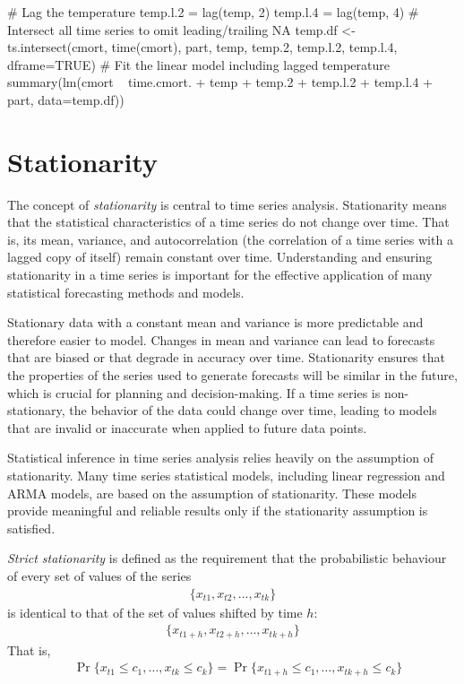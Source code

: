 \begin{samepage}
\begin{Rcode}
# Lag the temperature
temp.l.2 = lag(temp, 2)
temp.l.4 = lag(temp, 4)
# Intersect all time series to omit leading/trailing NA
temp.df <- ts.intersect(cmort, time(cmort), part, 
                  temp, temp.2, temp.l.2, temp.l.4, dframe=TRUE)
# Fit the linear model including lagged temperature
summary(lm(cmort ~ time.cmort. + temp + temp.2 + 
                      temp.l.2 + temp.l.4 + part, data=temp.df))
\end{Rcode}
\end{samepage}

\section{Stationarity}

The concept of \emph{stationarity} is central to time series analysis. Stationarity means that the statistical characteristics of a time series do not change over time. That is, its mean, variance, and autocorrelation (the correlation of a time series with a lagged copy of itself) remain constant over time. Understanding and ensuring stationarity in a time series is important for the effective application of many statistical forecasting methods and models.

Stationary data with a constant mean and variance is more predictable and therefore easier to model. Changes in mean and variance can lead to forecasts that are biased or that degrade in accuracy over time. Stationarity ensures that the properties of the series used to generate forecasts will be similar in the future, which is crucial for planning and decision-making. If a time series is non-stationary, the behavior of the data could change over time, leading to models that are invalid or inaccurate when applied to future data points.

Statistical inference in time series analysis relies heavily on the assumption of stationarity. Many time series statistical models, including linear regression and ARMA models, are based on the assumption of stationarity. These models provide meaningful and reliable results only if the stationarity assumption is satisfied. 

\emph{Strict stationarity} is defined as the requirement that the probabilistic behaviour of every set of values of the series
\begin{align*}\{x_{t1}, x_{t2}, \ldots, x_{tk} \} \end{align*}
\noindent is identical to that of the set of values shifted by time $h$:
\begin{align*}
\{x_{t1+h}, x_{t2+h}, \ldots, x_{tk + h} \}
\end{align*}
\noindent That is,
\begin{align*}
&\Pr \{ x_{t1} \leq c_1, \ldots, x_{tk} \leq c_k \} = \Pr \{ x_{t1+h}\leq c_1, \ldots , x_{tk+h} \leq c_k \}
\end{align*}

